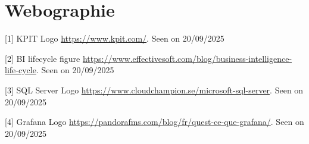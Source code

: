 \chapter*{ Webographie}
\renewcommand{\chaptername}{Chapter}

\begin{flushleft}
    
[\label{kpit}1] KPIT Logo \href{https://www.kpit.com/}{https://www.kpit.com/}. Seen on 20/09/2025

[\label{bilifecycle}2] BI lifecycle figure \href{https://www.effectivesoft.com/blog/business-intelligence-life-cycle.html#conclusion}{https://www.effectivesoft.com/blog/business-intelligence-life-cycle}. Seen on 20/09/2025



[\label{sqlserver}3] SQL Server Logo \href{https://www.cloudchampion.se/microsoft-sql-server-logopedia-fandom-powered-by-wikia-simpleminimalist-sql-logo-lovable-2/}{https://www.cloudchampion.se/microsoft-sql-server}. Seen on 20/09/2025


[\label{grafana}4] Grafana Logo \href{https://pandorafms.com/blog/fr/quest-ce-que-grafana/}{https://pandorafms.com/blog/fr/quest-ce-que-grafana/}. Seen on 20/09/2025

\end{flushleft}